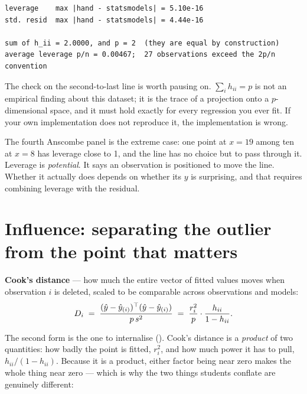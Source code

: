 \documentclass[
  letterpaper,
  10pt,
  twoside,
  openright,
  numbers=noenddot,
  chapterprefix=true]{scrbook}
\begin{document}
\begin{verbatim}
leverage    max |hand - statsmodels| = 5.10e-16
std. resid  max |hand - statsmodels| = 4.44e-16

sum of h_ii = 2.0000, and p = 2  (they are equal by construction)
average leverage p/n = 0.00467;  27 observations exceed the 2p/n convention
\end{verbatim}

The check on the second-to-last line is worth pausing on.
\(\sum_i h_{ii} = p\) is not an empirical finding about this dataset; it
is the trace of a projection onto a \(p\)-dimensional space, and it must
hold exactly for every regression you ever fit. If your own
implementation does not reproduce it, the implementation is wrong.

The fourth Anscombe panel is the extreme case: one point at \(x = 19\)
among ten at \(x = 8\) has leverage close to 1, and the line has no
choice but to pass through it. Leverage is \emph{potential}. It says an
observation is positioned to move the line. Whether it actually does
depends on whether its \(y\) is surprising, and that requires combining
leverage with the residual.

\section{Influence: separating the outlier from the point that
matters}\label{influence-separating-the-outlier-from-the-point-that-matters}

\begin{qmibdefinition}

{\textbf{Cook's distance}} --- how much the entire vector of fitted
values moves when observation \(i\) is deleted, scaled to be comparable
across observations and models: \[
D_i \thickspace=\thickspace \frac{(\hat y - \hat y_{(i)})^{\top}(\hat y - \hat y_{(i)})}{p\thinspace s^2}
\thickspace=\thickspace \frac{r_i^{2}}{p}\cdot\frac{h_{ii}}{1 - h_{ii}} .
\]

\end{qmibdefinition}

The second form is the one to internalise (). Cook's distance is a \emph{product} of two quantities: how badly
the point is fitted, \(r_i^2\), and how much power it has to pull,
\(h_{ii}/(1-h_{ii})\). Because it is a product, either factor being near
zero makes the whole thing near zero --- which is why the two things
students conflate are genuinely different:
\end{document}
